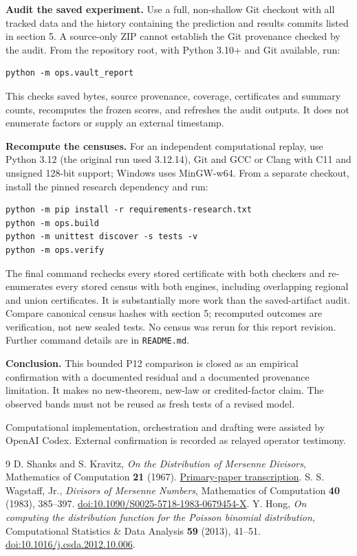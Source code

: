 \documentclass[11pt,a4paper]{article}
\begin{document}
\textbf{Audit the saved experiment.} Use a full, non-shallow Git checkout
with all tracked data and the history containing the prediction and results
commits listed in section 5. A source-only ZIP cannot establish the Git
provenance checked by the audit. From the repository root, with Python
3.10+ and Git available, run:
\begin{verbatim}
python -m ops.vault_report
\end{verbatim}
This checks saved bytes, source provenance, coverage, certificates and
summary counts, recomputes the frozen scores, and refreshes the audit
outputs. It does not enumerate factors or supply an external timestamp.

\textbf{Recompute the censuses.} For an independent computational replay,
use Python 3.12 (the original run used 3.12.14), Git and GCC or Clang with
C11 and unsigned 128-bit support; Windows uses MinGW-w64. From a separate
checkout, install the pinned research dependency and run:
\begin{verbatim}
python -m pip install -r requirements-research.txt
python -m ops.build
python -m unittest discover -s tests -v
python -m ops.verify
\end{verbatim}
The final command rechecks every stored certificate with both checkers and
re-enumerates every stored census with both engines, including overlapping
regional and union certificates. It is substantially more work than the
saved-artifact audit. Compare canonical census hashes with section 5;
recomputed outcomes are verification, not new sealed tests. No census was
rerun for this report revision. Further command details are in \texttt{README.md}.

\textbf{Conclusion.} This bounded P12 comparison is closed as an empirical
confirmation with a documented residual and a documented provenance
limitation. It makes no new-theorem, new-law or credited-factor claim.
The observed bands must not be reused as fresh tests of a revised model.

{\small Computational implementation, orchestration and drafting were assisted
by OpenAI Codex. External confirmation is recorded as relayed operator testimony.}

\begin{thebibliography}{9}\small
{} D. Shanks and S. Kravitz, \emph{On the Distribution of Mersenne
Divisors}, Mathematics of Computation \textbf{21} (1967).
\href{https://t5k.org/mersenne/literature/shanksKravitz.html}{Primary-paper transcription}.
 S. S. Wagstaff, Jr., \emph{Divisors of Mersenne Numbers},
Mathematics of Computation \textbf{40} (1983), 385--397.
\href{https://doi.org/10.1090/S0025-5718-1983-0679454-X}{doi:10.1090/S0025-5718-1983-0679454-X}.
 Y. Hong, \emph{On computing the distribution function for the
Poisson binomial distribution}, Computational Statistics \& Data Analysis
\textbf{59} (2013), 41--51.
\href{https://doi.org/10.1016/j.csda.2012.10.006}{doi:10.1016/j.csda.2012.10.006}.
\end{thebibliography}
\end{document}
